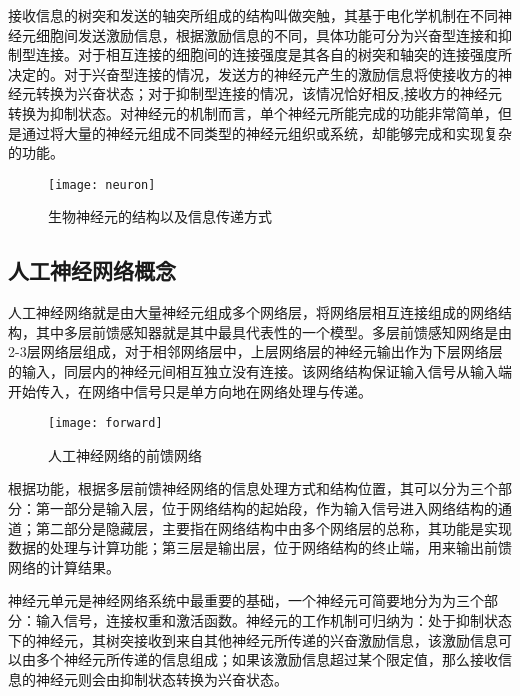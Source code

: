 接收信息的树突和发送的轴突所组成的结构叫做突触，其基于电化学机制在不同神经元细胞间发送激励信息，根据激励信息的不同，具体功能可分为兴奋型连接和抑制型连接。对于相互连接的细胞间的连接强度是其各自的树突和轴突的连接强度所决定的。对于兴奋型连接的情况，发送方的神经元产生的激励信息将使接收方的神经元转换为兴奋状态；对于抑制型连接的情况，该情况恰好相反,接收方的神经元转换为抑制状态。对神经元的机制而言，单个神经元所能完成的功能非常简单，但是通过将大量的神经元组成不同类型的神经元组织或系统，却能够完成和实现复杂的功能。


\begin{figure}[H] %
  \centering
  \texttt{[image: neuron]}
  \caption{生物神经元的结构以及信息传递方式}
\end{figure}



\subsection{人工神经网络概念}
人工神经网络就是由大量神经元组成多个网络层，将网络层相互连接组成的网络结构，其中多层前馈感知器就是其中最具代表性的一个模型。多层前馈感知网络是由2-3层网络层组成，对于相邻网络层中，上层网络层的神经元输出作为下层网络层的输入，同层内的神经元间相互独立没有连接。该网络结构保证输入信号从输入端开始传入，在网络中信号只是单方向地在网络处理与传递。

\begin{figure}[H] %
  \centering
  \texttt{[image: forward]}
  \caption{人工神经网络的前馈网络}
  \label{fig:system}
\end{figure}


根据功能，根据多层前馈神经网络的信息处理方式和结构位置，其可以分为三个部分：第一部分是输入层，位于网络结构的起始段，作为输入信号进入网络结构的通道；第二部分是隐藏层，主要指在网络结构中由多个网络层的总称，其功能是实现数据的处理与计算功能；第三层是输出层，位于网络结构的终止端，用来输出前馈网络的计算结果。


神经元单元是神经网络系统中最重要的基础，一个神经元可简要地分为为三个部分：输入信号，连接权重和激活函数。神经元的工作机制可归纳为：处于抑制状态下的神经元，其树突接收到来自其他神经元所传递的兴奋激励信息，该激励信息可以由多个神经元所传递的信息组成；如果该激励信息超过某个限定值，那么接收信息的神经元则会由抑制状态转换为兴奋状态。


